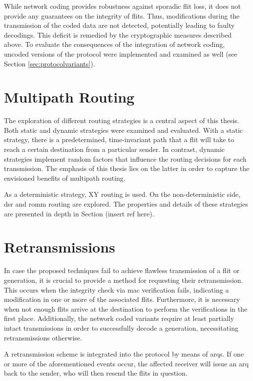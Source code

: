 While network coding provides robustness against sporadic flit loss, it does not provide any guarantees on the integrity of flits. Thus, modifications
during the transmission of the coded data are not detected, potentially leading to faulty decodings. This deficit is remedied by the cryptographic
measures described above. To evaluate the consequences of the integration of network coding, uncoded versions of the protocol were implemented and
examined as well (see Section \ref{sec:protocolvariants}).


\section{Multipath Routing}
The exploration of different routing strategies is a central aspect of this thesis. Both static and dynamic strategies were
examined and evaluated. With a static strategy, there is a predetermined, time-invariant path that a flit will take to reach a certain destination
from a particular sender. In contrast, dynamic strategies implement random factors that influence the routing decisions for each
transmission. The emphasis of this thesis lies on the latter in order to capture the envisioned benefits of multipath routing.

As a deterministic strategy, XY routing is used. On the non-deterministic side, \gls{dsr} and \gls{romm} routing are explored. The properties and
details of these strategies are presented in depth in Section (insert ref here).

\section{Retransmissions}\label{sec:retransmissions}
In case the proposed techniques fail to achieve flawless transmission of a flit or generation, it is crucial to provide a method for requesting
their retransmission. This occurs when the integrity check via \gls{mac} verification fails, indicating a modification in one or more of the
associated flits. Furthermore, it is necessary when not enough flits arrive at the destination to perform the verifications in the first place.
Additionally, the network coded variants require at least partially intact transmissions in order to successfully decode a generation, necessitating
retransmissions otherwise.

A retransmission scheme is integrated into the protocol by means of \glspl{arq}. If one or more of the aforementioned events occur, the affected
receiver will issue an \gls{arq} back to the sender, who will then resend the flits in question.

